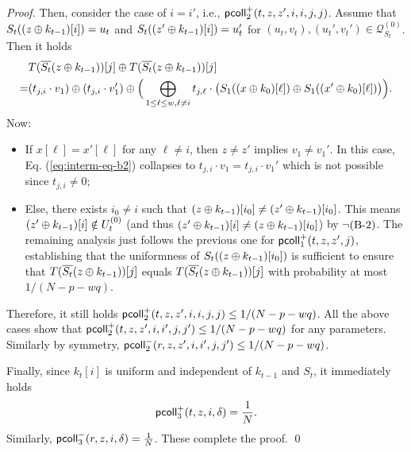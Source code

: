 \begin{proof}
	
	Then, consider the case of $i=i'$, i.e., $\mathsf{pcoll}_{2}^+(t,z,z',i,i,j,j)$. Assume that $S_t((z\oplus k_{t-1})[i])=u_t$ and $S_t((z'\oplus k_{t-1})[i])=u_t'$ for $(u_t,v_t),(u_t',v_t')\in\mathcal{Q}_{S_t}^{(0)}$. Then it holds      {\small
		\begin{align}
		&   T(\overline{S_t}(z\oplus k_{t-1}))[j]\oplus T(\overline{S_t}(z\oplus k_{t-1}))[j]        \notag   \\
		= &
		(t_{j,i}\cdot v_1)
		\oplus
		(t_{j,i}\cdot v_1')
		\oplus
		\Big(\bigoplus_{1\leq\ell\leq w,\ell\neq i}t_{j,\ell}\cdot
		\big(S_1((x\oplus k_0)[\ell])\oplus S_1((x'\oplus k_0)[\ell])\big)\Big)    .
		\label{eq:interm-eq-b2}
		\end{align}
	}%
	Now:
	\begin{itemize}
		\item If $x[\ell]=x'[\ell]$ for any $\ell\neq i$, then $z\neq z'$ implies $v_1\neq v_1'$. In this case, Eq. (\ref{eq:interm-eq-b2}) collapses to $t_{j,i}\cdot v_1=t_{j,i}\cdot v_1'$ which is not possible since $t_{j,i}\neq 0$;
		\item Else, there exists $i_0\neq i$ such that $(z\oplus k_{t-1})[i_0]\neq(z'\oplus k_{t-1})[i_0]$. This means $(z'\oplus k_{t-1})[i]\notin U_t^{(0)}$ (and thus $(z'\oplus k_{t-1})[i]\neq(z\oplus k_{t-1})[i_0]$) by $\neg\text{(B-2)}$. The remaining analysis just follows the previous one for $\mathsf{pcoll}_{1}^+(t,z,z',j)$, establishing that the uniformness of $S_t((z\oplus k_{t-1})[i_0])$ is sufficient to ensure that $T(\overline{S_t}(z\oplus k_{t-1}))[j]$ equals $T(\overline{S_t}(z\oplus k_{t-1}))[j]$ with probability at most $1/(N-p-wq)$.
	\end{itemize}
	Therefore, it still holds $\mathsf{pcoll}_{2}^+(t,z,z',i,i,j,j)\leq1/(N-p-wq)$. All the above cases show that $\mathsf{pcoll}_{2}^+(t,z,z',i,i',j,j')\leq1/(N-p-wq)$ for any parameters. Similarly by symmetry, $\mathsf{pcoll}_{2}^-(r,z,z',i,i',j,j')\leq1/(N-p-wq)$.
	
	
	\arrangespace
	
	
	
	Finally, since $k_t[i]$ is uniform and independent of $k_{t-1}$ and $S_t$, it immediately holds
	$$\mathsf{pcoll}_{3}^+(t,z,i,\delta)=\frac{1}{N}.$$
	Similarly, $\mathsf{pcoll}_{3}^-(r,z,i,\delta)=\frac{1}{N}$. These complete the proof.     \qed
\end{proof}





